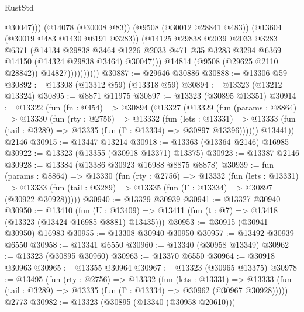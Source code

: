 \begin{lexlean}{RustStd}
\begin{coremodule}
                                @30047)))
                          (@14078 (@30008 @83))
                          (@9508 (@30012 @28841 @483))
                          (@13604 (@30019 @483 @1430 @6191 @3283))
                          (@14125
                            @29838
                            @2039
                            @2033
                            @3283
                            @6371
                            (@14134
                              @29838
                              @3464
                              @1226
                              @2033
                              @471
                              @35
                              @3283
                              @3294
                              @6369
                              @14150
                              (@14324 @29838 @3464)
                              @30047)))
                        @14814
                        (@9508 (@29625 @2110 @28842))
                        @14827))))))))))
@30887 := @29646 @30886
@30888 := @13306 @59
@30892 := @13308 (@13312 @59) (@13318 @59)
@30894 := @13323 (@13212 @13324)
@30895 := @8871 @11975
@30897 := @13323 (@30895 @13351)
@30914 := @13322
    (fun (fn : @454) =>
    @30894
      (@13327
        (@13329
          (fun (params : @8864) =>
          @13330
            (fun (rty : @2756) =>
            @13332
              (fun (lets : @13331) =>
              @13333 (fun (tail : @3289) => @13335 (fun (Γ : @13334) => @30897 @13396))))))
        @13441))
    @2146
@30915 := @13447 @13214
@30918 := @13363 (@13364 @2146) @16985
@30922 := @13323 (@13355 (@30918 @13371) @13375)
@30923 := @13387 @2146
@30928 := @13384 (@13386 @30923 @16988 @8875 @8878)
@30939 := fun (params : @8864) =>
  @13330
    (fun (rty : @2756) =>
    @13332
      (fun (lets : @13331) =>
      @13333 (fun (tail : @3289) => @13335 (fun (Γ : @13334) => @30897 (@30922 @30928)))))
@30940 := @13329 @30939
@30941 := @13327 @30940
@30950 := @13410
    (fun (U : @13409) => @13411 (fun (t : @7) => @13418 (@13323 (@13424 @16985 @8881) @13435)))
@30953 := @30915 (@30941 @30950) @16983
@30955 := @13308 @30940 @30950
@30957 := @13492 @30939 @6550
@30958 := @13341 @6550
@30960 := @13340 (@30958 @13349)
@30962 := @13323 (@30895 @30960)
@30963 := @13370 @6550
@30964 := @30918 @30963
@30965 := @13355 @30964
@30967 := @13323 (@30965 @13375)
@30978 := @13495
    (fun (rty : @2756) =>
    @13332
      (fun (lets : @13331) =>
      @13333 (fun (tail : @3289) => @13335 (fun (Γ : @13334) => @30962 (@30967 @30928)))))
    @2773
@30982 := @13323 (@30895 (@13340 (@30958 @20610)))

\end{coremodule}
\end{lexlean}
